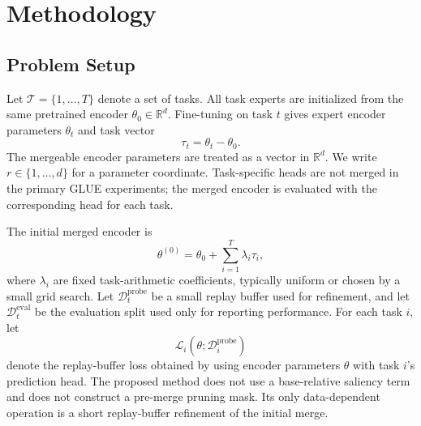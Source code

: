 \documentclass[11pt]{article}
\newcommand{\thetab}{\theta_0}
\newcommand{\taskvec}{\tau}
\newcommand{\loss}{\mathcal{L}}
\newcommand{\tasks}{\mathcal{T}}
\newcommand{\data}{\mathcal{D}}
\newcommand{\R}{\mathbb{R}}
\begin{document}
\section{Methodology}

\subsection{Problem Setup}
Let $\tasks = \{1,\ldots,T\}$ denote a set of tasks. All task experts are initialized from the same pretrained encoder $\thetab \in \R^d$. Fine-tuning on task $t$ gives expert encoder parameters $\theta_t$ and task vector
\begin{equation}
    \taskvec_t = \theta_t - \thetab.
    \label{eq:task-vector}
\end{equation}
The mergeable encoder parameters are treated as a vector in $\R^d$. We write $r \in \{1,\ldots,d\}$ for a parameter coordinate. Task-specific heads are not merged in the primary GLUE experiments; the merged encoder is evaluated with the corresponding head for each task.

The initial merged encoder is
\begin{equation}
    \theta^{(0)} = \thetab + \sum_{i=1}^{T}\lambda_i\taskvec_i,
    \label{eq:initial-merge}
\end{equation}
where $\lambda_i$ are fixed task-arithmetic coefficients, typically uniform or chosen by a small grid search. Let $\data_t^{\mathrm{probe}}$ be a small replay buffer used for refinement, and let $\data_t^{\mathrm{eval}}$ be the evaluation split used only for reporting performance. For each task $i$, let
\begin{equation}
    \loss_i(\theta;\data_i^{\mathrm{probe}})
    \label{eq:task-loss}
\end{equation}
denote the replay-buffer loss obtained by using encoder parameters $\theta$ with task $i$'s prediction head.
The proposed method does not use a base-relative saliency term and does not construct a pre-merge pruning mask. Its only data-dependent operation is a short replay-buffer refinement of the initial merge.
\end{document}
